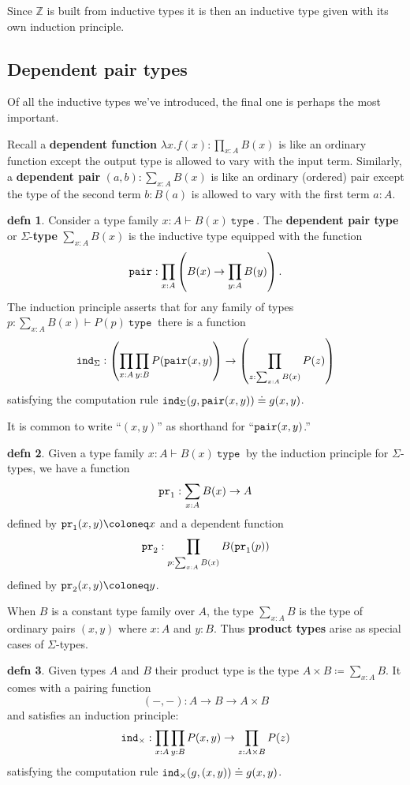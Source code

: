 \documentclass{amsart}
\theoremstyle{theorem}
\theoremstyle{definition}
\newtheorem*{defn}{defn}
\theoremstyle{remark}
\newcommand{\0}{\mathbbe{0}}
\newcommand{\1}{\mathbbe{1}}
\newcommand{\2}{\mathbbe{2}}
\newcommand{\3}{\mathbbe{3}}
\newcommand{\4}{\mathbbe{4}}
\newcommand{\univ}{{~\texttt{type}~}}
\newcommand{\term}[1]{{\textup{\texttt{#1}}}}
\newcommand{\ind}{\term{ind}}
\newcommand{\pair}{\term{pair}}
\newcommand{\pr}{\term{pr}}
\newcommand{\bZ}{{\mathbb{Z}}}
\begin{document}
Since $\bZ$ is built from inductive types it is then an inductive type given with its own induction principle.

\subsection*{Dependent pair types}

Of all the inductive types we've introduced, the final one is perhaps the most important.

Recall a \textbf{dependent function} $\lambda x . f(x) : \prod_{x : A}B(x)$ is like an ordinary function except the output type is allowed to vary with the input term. Similarly, a \textbf{dependent pair} $(a,b) : \sum_{x : A}B(x)$ is like an ordinary (ordered) pair except the type of the second term $b : B(a)$ is allowed to vary with the first term $a :A$.

\begin{defn} Consider a type family $x : A \vdash B(x) \univ$. The \textbf{dependent pair type} or $\Sigma$-\textbf{type} $\sum_{x :A}B(x)$ is the inductive type equipped with the function
\[ \pair : \prod_{x : A} \left(B(x) \to \prod_{y : A}B(y)\right).\]
The induction principle asserts that for any family of types $p : \sum_{x :A} B(x) \vdash P(p) \univ$ there is a function
\[ \ind_\Sigma : \left( \prod_{x :A} \prod_{y : B}P(\pair(x,y) \right) \to \left( \prod_{z : \sum_{x :A}B(x)}P(z) \right)
\]
satisfying the computation rule $\ind_\Sigma (g,\pair(x,y)) \doteq g(x,y)$.
\end{defn}

It is common to write ``$(x,y)$'' as shorthand for ``$\pair(x,y)$.''

\begin{defn} Given a type family $x :A \vdash B(x) \univ$ by the induction principle for $\Sigma$-types, we have a function
\[ \pr_1 : \sum_{x :A}B(x) \to A\]
defined by $\pr_1(x,y) \coloneq x$ and a dependent function
\[ \pr_2 :  \prod_{ p : \sum_{x :A}B(x)} B(\pr_1(p))\]
defined by $\pr_2(x,y) \coloneq y$.
\end{defn}

When $B$ is a constant type family over $A$, the type $\sum_{x : A}B$ is the type of ordinary pairs $(x,y)$ where $x :A $ and $y: B$. Thus \textbf{product types} arise as special cases of $\Sigma$-types.

\begin{defn} Given types $A$ and $B$ their product type is the type $A \times B \coloneq \sum_{x :A}B$. It comes with a pairing function
\[ (-,-) : A \to B \to A \times B\] and satisfies an induction principle:
\[ \ind_\times : \prod_{x : A} \prod_{y : B} P(x,y) \to \prod_{z : A \times B} P(z)\]
satisfying the computation rule $\ind_\times (g,(x,y)) \doteq g(x,y)$.
\end{defn}
\end{document}
